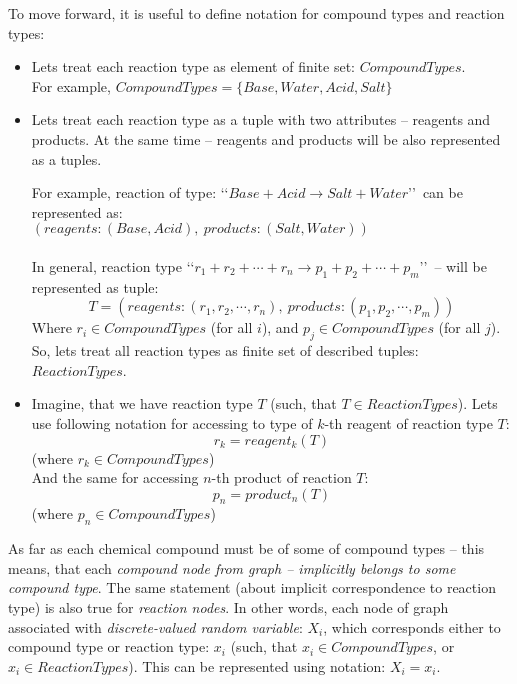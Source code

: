 \documentclass[10pt]{article}
\begin{document}
\noindent To move forward, it is useful to define notation for compound types and reaction types:
\begin{itemize}

    \item Lets treat each reaction type as element of finite set: $CompoundTypes$. \\
    For example, $CompoundTypes = \{Base, Water, Acid, Salt\}$

    \item Lets treat each reaction type as a tuple with two attributes -- reagents and products. At the same time -- reagents and products will be also represented as a tuples. 

For example, reaction of type: \lq \lq$Base + Acid \rightarrow Salt + Water$\rq \rq \ can be represented as: \\
$(reagents: (Base, Acid),\ products: (Salt, Water))$ \\ \\
In general, reaction type \lq \lq$r_1 + r_2 + \cdots + r_n \rightarrow p_1 + p_2 + \cdots + p_m$\rq \rq \ -- will be represented as tuple:
\begin{equation} \label{eq:reaction_type_notation}
T = (reagents:(r_1, r_2, \cdots , r_n),\ products:(p_1, p_2, \cdots , p_m))
\end{equation}
Where $r_i \in CompoundTypes$ (for all $i$), and $p_j \in CompoundTypes$ (for all $j$). \\
So, lets treat all reaction types as finite set of described tuples: $ReactionTypes$.

    \item Imagine, that we have reaction type $T$ (such, that $T \in ReactionTypes$). Lets use following notation for accessing to type of $k$-th reagent of reaction type $T$:
\begin{equation} \label{eq:access_reagent_type_notation}
r_k = reagent_k(T)
\end{equation}   
(where $r_k \in CompoundTypes$) \\

And the same for accessing $n$-th product of reaction $T$:
\begin{equation} \label{eq:access_product_type_notation}
p_n = product_n(T)
\end{equation}   
(where $p_n \in CompoundTypes$)

\end{itemize}

\noindent As far as each chemical compound must be of some of compound types -- this means, that each \emph{compound node from graph -- implicitly belongs to some compound type}. The same statement (about implicit correspondence to reaction type) is also true for \emph{reaction nodes}. In other words, each node of graph associated with \emph{discrete-valued random variable}: $X_i$, which corresponds either to compound type or reaction type: $x_i$ (such, that $x_i \in CompoundTypes$, or $x_i \in ReactionTypes$). This can be represented using notation: $X_i = x_i$. 
\end{document}
